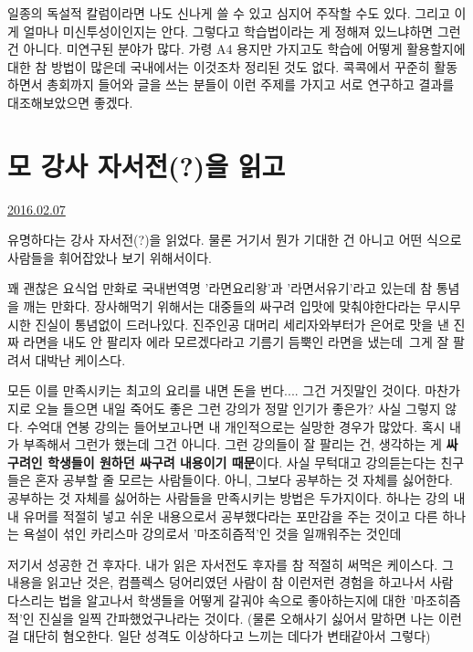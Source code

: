 일종의 독설적 칼럼이라면 나도 신나게 쓸 수 있고 심지어 주작할 수도 있다. 그리고 이게 얼마나 미신투성이인지는 안다.
그렇다고 학습법이라는 게 정해져 있느냐하면 그런 건 아니다. 미연구된 분야가 많다.
가령 A4 용지만 가지고도 학습에 어떻게 활용할지에 대한 참 방법이 많은데 국내에서는 이것조차 정리된 것도 없다.
콕콕에서 꾸준히 활동하면서 총회까지 들어와 글을 쓰는 분들이 이런 주제를 가지고 서로 연구하고 결과를 대조해보았으면 좋겠다.
\vspace{5mm}






\section{모 강사 자서전(?)을 읽고}
\href{https://www.kockoc.com/Apoc/626687}{2016.02.07}

\vspace{5mm}

유명하다는 강사 자서전(?)을 읽었다. 물론 거기서 뭔가 기대한 건 아니고 어떤 식으로 사람들을 휘어잡았나 보기 위해서이다.
\vspace{5mm}

꽤 괜찮은 요식업 만화로 국내번역명 '라면요리왕'과 '라면서유기'라고 있는데 참 통념을 깨는 만화다.
장사해먹기 위해서는 대중들의 싸구려 입맛에 맞춰야한다라는 무시무시한 진실이 통념없이 드러나있다.
진주인공 대머리 세리자와부터가 은어로 맛을 낸 진짜 라면을 내도 안 팔리자
에라 모르겠다라고 기름기 듬뿍인 라면을 냈는데 그게 잘 팔려서 대박난 케이스다.
\vspace{5mm}

모든 이를 만족시키는 최고의 요리를 내면 돈을 번다.... 그건 거짓말인 것이다.
마찬가지로 오늘 들으면 내일 죽어도 좋은 그런 강의가 정말 인기가 좋은가? 사실 그렇지 않다.
수억대 연봉 강의는 들어보고나면 내 개인적으로는 실망한 경우가 많았다. 혹시 내가 부족해서 그런가 했는데 그건 아니다.
그런 강의들이 잘 팔리는 건, 생각하는 게 \textbf{싸구려인 학생들이 원하던 싸구려 내용이기 때문}이다.
사실 무턱대고 강의듣는다는 친구들은 혼자 공부할 줄 모르는 사람들이다. 아니, 그보다 공부하는 것 자체를 싫어한다.
공부하는 것 자체를 싫어하는 사람들을 만족시키는 방법은 두가지이다.
하나는 강의 내내 유머를 적절히 넣고 쉬운 내용으로서 공부했다라는 포만감을 주는 것이고
다른 하나는 욕설이 섞인 카리스마 강의로서 '마조히즘적'인 것을 일깨워주는 것인데
\vspace{5mm}

저기서 성공한 건 후자다.
내가 읽은 자서전도 후자를 참 적절히 써먹은 케이스다.
그 내용을 읽고난 것은, 컴플렉스 덩어리였던 사람이 참 이런저런 경험을 하고나서 사람 다스리는 법을 알고나서
학생들을 어떻게 갈궈야 속으로 좋아하는지에 대한 '마조히즘적'인 진실을 일찍 간파했었구나라는 것이다.
(물론 오해사기 싫어서 말하면 나는 이런 걸 대단히 혐오한다. 일단 성격도 이상하다고 느끼는 데다가 변태같아서 그렇다)
\vspace{5mm}

